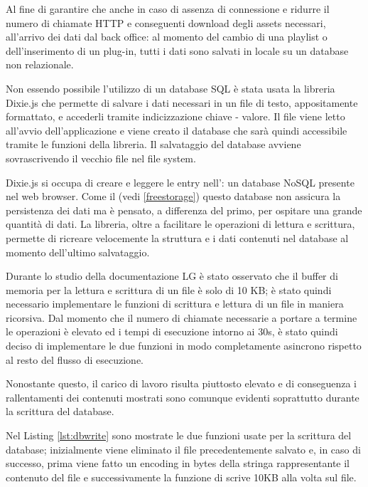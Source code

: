 Al fine di garantire che anche in caso di assenza di connessione e ridurre il numero di chiamate HTTP e conseguenti download degli assets necessari, all'arrivo dei dati dal back office: al momento del cambio di una playlist o dell'inserimento di un plug-in, tutti i dati sono salvati in locale su un database non relazionale.

Non essendo possibile l'utilizzo di un database SQL è stata usata la libreria Dixie.js \cite{dixie} che permette di salvare i dati necessari in un file di testo, appositamente formattato, e accederli tramite indicizzazione chiave - valore. Il file viene letto all'avvio dell'applicazione e viene creato il database che sarà quindi accessibile tramite le funzioni della libreria. Il salvataggio del database avviene sovrascrivendo il vecchio file nel file system.

Dixie.js si occupa di creare e leggere le entry nell': un database NoSQL presente nel web browser. Come il  (vedi \ref*{freestorage}) questo database non assicura la persistenza dei dati ma è pensato, a differenza del primo, per ospitare una grande quantità di dati. La libreria, oltre a facilitare le operazioni di lettura e scrittura, permette di ricreare velocemente la struttura e i dati contenuti nel database al momento dell'ultimo salvataggio.

Durante lo studio della documentazione LG è stato osservato che il buffer di memoria per la lettura e scrittura di un file è solo di 10 KB; è stato quindi necessario implementare le funzioni di scrittura e lettura di un file in maniera ricorsiva.
Dal momento che il numero di chiamate necessarie a portare a termine le operazioni è elevato ed i tempi di esecuzione intorno ai 30s, è stato quindi deciso di implementare le due funzioni in modo completamente asincrono rispetto al resto del flusso di esecuzione. 

Nonostante questo, il carico di lavoro risulta piuttosto elevato e di conseguenza i rallentamenti dei contenuti mostrati sono comunque evidenti soprattutto durante la scrittura del database. 



Nel Listing \ref*{lst:dbwrite} sono mostrate le due funzioni usate per la scrittura del database; inizialmente viene eliminato il file precedentemente salvato e, in caso di successo, prima viene fatto un encoding in bytes della stringa rappresentante il contenuto del file e successivamente la funzione di  scrive 10KB alla volta sul file.

